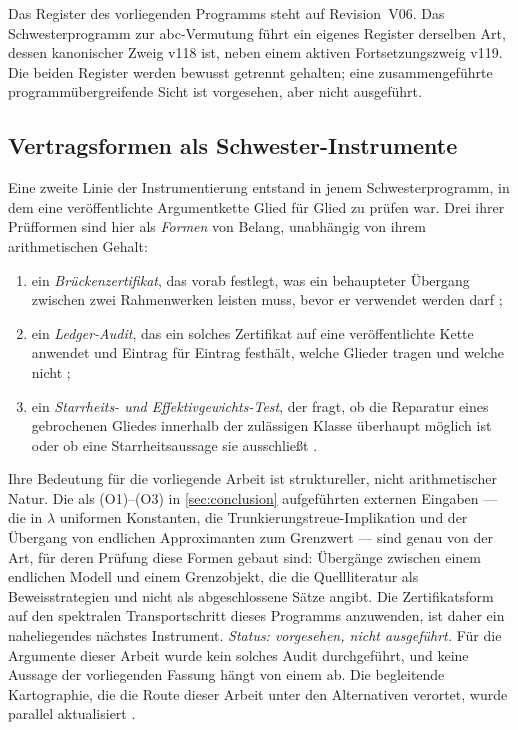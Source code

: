 \documentclass[12pt,a4paper]{article}
\theoremstyle{definition}
\theoremstyle{remark}
\begin{document}
Das Register des vorliegenden Programms steht auf Revision~V06.  Das
Schwesterprogramm zur abc-Vermutung führt ein eigenes Register derselben
Art, dessen kanonischer Zweig v118 ist, neben einem aktiven
Fortsetzungszweig v119.  Die beiden Register werden bewusst getrennt
gehalten; eine zusammengeführte programmübergreifende Sicht ist
vorgesehen, aber nicht ausgeführt.

\subsection{Vertragsformen als Schwester-Instrumente}

Eine zweite Linie der Instrumentierung entstand in jenem
Schwesterprogramm, in dem eine veröffentlichte Argumentkette Glied für
Glied zu prüfen war.  Drei ihrer Prüfformen sind hier als \emph{Formen}
von Belang, unabhängig von ihrem arithmetischen Gehalt:
\begin{enumerate}[label=(C\arabic*)]
\item ein \emph{Brückenzertifikat}, das vorab festlegt, was ein
  behaupteter Übergang zwischen zwei Rahmenwerken leisten muss, bevor er
  verwendet werden darf \cite{Geiger2026bridge};
\item ein \emph{Ledger-Audit}, das ein solches Zertifikat auf eine
  veröffentlichte Kette anwendet und Eintrag für Eintrag festhält,
  welche Glieder tragen und welche nicht \cite{Geiger2026ledger};
\item ein \emph{Starrheits- und Effektivgewichts-Test}, der fragt, ob die
  Reparatur eines gebrochenen Gliedes innerhalb der zulässigen Klasse
  überhaupt möglich ist oder ob eine Starrheitsaussage sie ausschließt
  \cite{Geiger2026rigidity}.
\end{enumerate}

Ihre Bedeutung für die vorliegende Arbeit ist struktureller, nicht
arithmetischer Natur.  Die als (O1)--(O3) in \cref{sec:conclusion}
aufgeführten externen Eingaben --- die in $\lambda$ uniformen
Konstanten, die Trunkierungstreue-Implikation und der Übergang von
endlichen Approximanten zum Grenzwert --- sind genau von der Art, für
deren Prüfung diese Formen gebaut sind: Übergänge zwischen einem
endlichen Modell und einem Grenzobjekt, die die Quellliteratur als
Beweisstrategien und nicht als abgeschlossene Sätze angibt.  Die
Zertifikatsform auf den spektralen Transportschritt dieses Programms
anzuwenden, ist daher ein naheliegendes nächstes Instrument.
\emph{Status: vorgesehen, nicht ausgeführt.}  Für die Argumente dieser
Arbeit wurde kein solches Audit durchgeführt, und keine Aussage der
vorliegenden Fassung hängt von einem ab.  Die begleitende Kartographie,
die die Route dieser Arbeit unter den Alternativen verortet, wurde
parallel aktualisiert \cite{Geiger2026atlas}.
\end{document}
